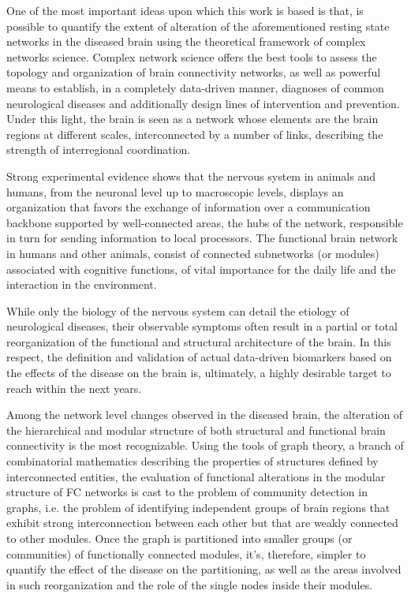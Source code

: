 One of the most important ideas upon which this work is based is that, is possible to quantify the extent of alteration of the aforementioned resting state networks in the diseased brain using the theoretical framework of complex networks science. Complex network science offers the best tools to assess the topology and organization of brain connectivity networks, as well as powerful means to establish, in a completely data-driven manner, diagnoses of common neurological diseases and additionally design lines of intervention and prevention. Under this light, the brain is seen as a network whose elements are the brain regions at different scales, interconnected by a number of links, describing the strength of interregional coordination.

Strong experimental evidence shows that the nervous system in animals and humans, from the neuronal level up to macroscopic levels, displays an organization that favors the exchange of information over a communication backbone supported by well-connected areas, the hubs of the network, responsible in turn for sending information to local processors. The functional brain network in humans and other animals, consist of connected subnetworks (or modules) associated with cognitive functions, of vital importance for the daily life and the interaction in the environment.

While only the biology of the nervous system can detail the etiology of neurological diseases, their observable symptoms often result in a partial or total reorganization of the functional and structural architecture of the brain. In this respect, the definition and validation of actual data-driven biomarkers based on the effects of the disease on the brain is, ultimately, a highly desirable target to reach within the next years.

Among the network level changes observed in the diseased brain, the alteration of the hierarchical and modular structure of both structural and functional brain connectivity is the most recognizable. Using the tools of graph theory, a branch of combinatorial mathematics describing the properties of structures defined by interconnected entities, the evaluation of functional alterations in the modular structure of FC networks is cast to the problem of community detection in graphs, i.e. the problem of identifying independent groups of brain regions that exhibit strong interconnection between each other but that are weakly connected to other modules. Once the graph is partitioned into smaller groups (or communities) of functionally connected modules, it’s, therefore, simpler to quantify the effect of the disease on the partitioning, as well as the areas involved in such reorganization and the role of the single nodes inside their modules.

